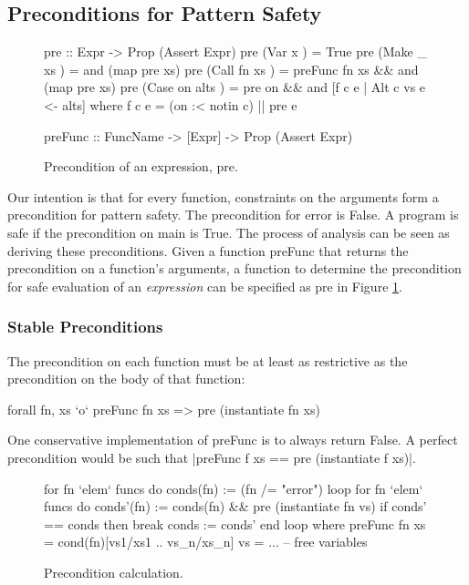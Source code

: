 \documentclass[preprint]{sigplanconf}
\newcommand{\C}[1]{\textsf{#1}}
\begin{document}
\subsection{Preconditions for Pattern Safety}
\label{sec:precond}

\begin{figure}
\begin{code}
pre :: Expr -> Prop (Assert Expr)
pre (Var   x         ) = True
pre (Make  _   xs    ) = and (map pre xs)
pre (Call  fn  xs    ) = preFunc fn xs && and (map pre xs)
pre (Case  on  alts  ) = pre on && and [f c e | Alt c vs e <- alts]
    where f c e = (on :< notin c) || pre e

preFunc :: FuncName -> [Expr] -> Prop (Assert Expr)
\end{code}
\caption{Precondition of an expression, \C{pre}.}
\label{fig:precondition}
\end{figure}

Our intention is that for every function, constraints on the arguments form a precondition for pattern safety. The precondition for \C{error} is False. A program is safe if the precondition on \C{main} is True. The process of analysis can be seen as deriving these preconditions. Given a function \C{preFunc} that returns the precondition on a function's arguments, a function to determine the precondition for safe evaluation of an \textit{expression} can be specified as \C{pre} in Figure \ref{fig:precondition}.

\subsubsection{Stable Preconditions}
\label{sec:fixp_precond}

The precondition on each function must be at least as restrictive as the precondition on the body of that function:

\begin{code}
forall fn, xs `o` preFunc fn xs => pre (instantiate fn xs)
\end{code}

One conservative implementation of \C{preFunc} is to always return False. A perfect precondition would be such that |preFunc f xs == pre (instantiate f xs)|.

\begin{figure}
\begin{code}
for fn `elem` funcs do conds(fn) := (fn /= "error")
loop
    for fn `elem` funcs do
        conds'(fn) := conds(fn) && pre (instantiate fn vs)
    if conds' == conds then break
    conds := conds'
end loop
    where
        preFunc fn xs = cond(fn)[vs1/xs1 .. vs_n/xs_n]
        vs = ... -- free variables
\end{code}
\caption{Precondition calculation.}
\label{fig:precond_fixp}
\end{figure}
\end{document}
